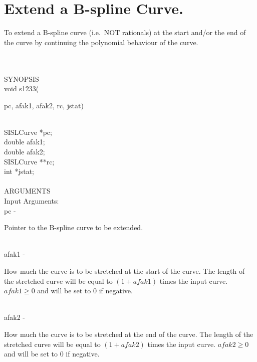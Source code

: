 \section{Extend a B-spline Curve.}
\begin{minipg1}
  To extend a B-spline curve (i.e.\ NOT rationals) at the start and/or
  the end of the curve by continuing the polynomial behaviour of the
  curve.
\end{minipg1} \\ \\
SYNOPSIS\\
        \>void s1233(\begin{minipg3}
          {\fov pc}, {\fov afak1}, {\fov afak2}, {\fov rc}, {\fov jstat})
        \end{minipg3}\\[0.3ex]
        \>\>    SISLCurve \>  *{\fov pc};\\
        \>\>    double    \>  {\fov afak1};\\
        \>\>    double    \>  {\fov afak2};\\
        \>\>    SISLCurve \>  **{\fov rc};\\
        \>\>    int       \>  *{\fov jstat};\\
\\
ARGUMENTS\\
        \>Input Arguments:\\
        \>\>    {\fov pc}    \> - \>
        \begin{minipg2}
          Pointer to the B-spline curve to be extended.
        \end{minipg2}\\[0.8ex]
        \>\>    {\fov afak1} \> - \>
        \begin{minipg2}
          How much the curve is to be stretched at the
          start of the curve. The length of the stretched
          curve will be equal to $(1+afak1)$ times the
          input curve. $afak1\geq 0$ and will be set to 0 if
          negative.
        \end{minipg2}\\[0.8ex]
        \>\>    {\fov afak2} \> - \>
        \begin{minipg2}
          How much the curve is to be stretched at the
          end of the curve. The length of the stretched
          curve will be equal to $(1+afak2)$ times the
          input curve. $afak2\geq 0$ and will be set to 0 if
          negative.
        \end{minipg2}\\[0.8ex]
